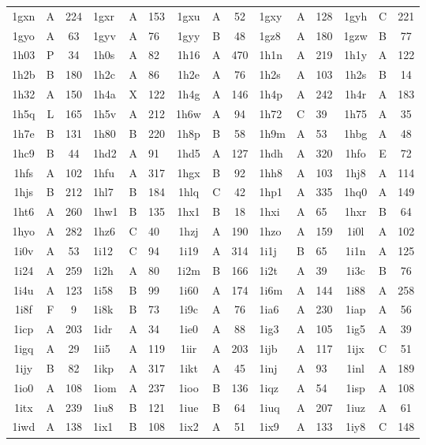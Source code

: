 \begin{longtable}{|c|c|c| a|a|a| c|c|c| a|a|a| c|c|c|}
1gxn & A & 224 & 1gxr & A & 153 & 1gxu & A & 52 & 1gxy & A & 128 & 1gyh & C & 221\\
1gyo & A & 63 & 1gyv & A & 76 & 1gyy & B & 48 & 1gz8 & A & 180 & 1gzw & B & 77\\
1h03 & P & 34 & 1h0s & A & 82 & 1h16 & A & 470 & 1h1n & A & 219 & 1h1y & A & 122\\
1h2b & B & 180 & 1h2c & A & 86 & 1h2e & A & 76 & 1h2s & A & 103 & 1h2s & B & 14\\
1h32 & A & 150 & 1h4a & X & 122 & 1h4g & A & 146 & 1h4p & A & 242 & 1h4r & A & 183\\
1h5q & L & 165 & 1h5v & A & 212 & 1h6w & A & 94 & 1h72 & C & 39 & 1h75 & A & 35\\
1h7e & B & 131 & 1h80 & B & 220 & 1h8p & B & 58 & 1h9m & A & 53 & 1hbg & A & 48\\
1hc9 & B & 44 & 1hd2 & A & 91 & 1hd5 & A & 127 & 1hdh & A & 320 & 1hfo & E & 72\\
1hfs & A & 102 & 1hfu & A & 317 & 1hgx & B & 92 & 1hh8 & A & 103 & 1hj8 & A & 114\\
1hjs & B & 212 & 1hl7 & B & 184 & 1hlq & C & 42 & 1hp1 & A & 335 & 1hq0 & A & 149\\
1ht6 & A & 260 & 1hw1 & B & 135 & 1hx1 & B & 18 & 1hxi & A & 65 & 1hxr & B & 64\\
1hyo & A & 282 & 1hz6 & C & 40 & 1hzj & A & 190 & 1hzo & A & 159 & 1i0l & A & 102\\
1i0v & A & 53 & 1i12 & C & 94 & 1i19 & A & 314 & 1i1j & B & 65 & 1i1n & A & 125\\
1i24 & A & 259 & 1i2h & A & 80 & 1i2m & B & 166 & 1i2t & A & 39 & 1i3c & B & 76\\
1i4u & A & 123 & 1i58 & B & 99 & 1i60 & A & 174 & 1i6m & A & 144 & 1i88 & A & 258\\
1i8f & F & 9 & 1i8k & B & 73 & 1i9c & A & 76 & 1ia6 & A & 230 & 1iap & A & 56\\
1icp & A & 203 & 1idr & A & 34 & 1ie0 & A & 88 & 1ig3 & A & 105 & 1ig5 & A & 39\\
1igq & A & 29 & 1ii5 & A & 119 & 1iir & A & 203 & 1ijb & A & 117 & 1ijx & C & 51\\
1ijy & B & 82 & 1ikp & A & 317 & 1ikt & A & 45 & 1inj & A & 93 & 1inl & A & 189\\
1io0 & A & 108 & 1iom & A & 237 & 1ioo & B & 136 & 1iqz & A & 54 & 1isp & A & 108\\
1itx & A & 239 & 1iu8 & B & 121 & 1iue & B & 64 & 1iuq & A & 207 & 1iuz & A & 61\\
1iwd & A & 138 & 1ix1 & B & 108 & 1ix2 & A & 51 & 1ix9 & A & 133 & 1iy8 & C & 148\\

\end{longtable}

